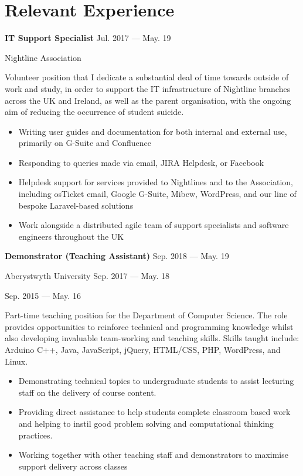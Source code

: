 \section{Relevant Experience}
\parbox[t][][t]{\linewidth}{
	\parbox{\linewidth}{{\textbf{IT Support Specialist}}
		\hfill {{Jul. 2017 --- May. 19}}}
	\smallbreak
	
	\parbox{\linewidth}{Nightline Association}
	
	\bigskip
	Volunteer position that I dedicate a substantial deal of time towards outside of work and study, in order to support the IT infrastructure of Nightline branches across the UK and Ireland, as well as the parent organisation, with the ongoing aim of reducing the occurrence of student suicide.
	
	\bigskip
	\begin{itemize}
		\item{Writing user guides and documentation for both internal and external use, primarily on G-Suite and Confluence}\\[-.6em]
		\item{Responding to queries made via email, JIRA Helpdesk, or Facebook}\\[-.6em]
		\item{Helpdesk support for services provided to Nightlines and to the Association, including osTicket email, Google G-Suite, Mibew, WordPress, and our line of bespoke Laravel-based solutions}\\[-.6em]
		\item{Work alongside a distributed agile team of support specialists and software engineers throughout the UK}\\[-.6em]
		\bigskip
		\bigskip
	\end{itemize}
}

\parbox[t][][t]{\linewidth}{
	\parbox{\linewidth}{{\textbf{Demonstrator (Teaching Assistant)}
		\hfill {{Sep. 2018 --- May. 19}}}}
	\parbox{\linewidth}{{Aberystwyth University
		\hfill {{Sep. 2017 --- May. 18}}}}
		\parbox{\linewidth}{{
			\hfill {{Sep. 2015 --- May. 16}}}}
	\smallbreak
	
	\bigskip
	Part-time teaching position for the Department of Computer Science. The role provides opportunities to reinforce technical and programming knowledge
	whilst also developing invaluable team-working and teaching skills. Skills taught include: Arduino C++, Java, JavaScript, jQuery, HTML/CSS, PHP, WordPress, and Linux.
			
	\bigskip
	\begin{itemize}
		\item{Demonstrating technical topics to undergraduate students to assist lecturing staff on the delivery of course content.}\\[-.6em]
		\item{Providing direct assistance to help students complete classroom based work and helping to instil good problem solving and computational thinking practices.}\\[-.6em]
		\item{Working together with other teaching staff and demonstrators to maximise support delivery across classes}\\[-.6em]
	\end{itemize}
	\bigskip
	\bigskip
}


